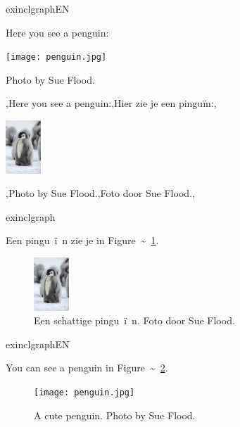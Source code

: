 \documentclass[presentatie.tex]{subfiles}
\begin{document}
\begin{saveblock}{exinclgraphEN}
	\begin{highlightblock}[linewidth=0.95\textwidth,framexleftmargin=0.25em]
		Here you see a penguin:
		\begin{center}
			\texttt{[image: penguin.jpg]}
		\end{center}
		Photo by Sue Flood.
	\end{highlightblock}
\end{saveblock}

\begin{frame}{}
	\vspace{-28px}
	
	\begin{penExResult}
		\lang,Here you see a penguin:,Hier zie je een pinguïn:,
		\begin{center}
			\includegraphics[height=2cm]{assets/pinguin.jpg}
		\end{center}
		\lang,Photo by Sue Flood.,Foto door Sue Flood.,
	\end{penExResult}
\end{frame}

\begin{saveblock}{exinclgraph}
	\begin{highlightblock}[linewidth=0.95\textwidth,framexleftmargin=0.25em]
		Een pingu~\"i~n zie je in Figure~\textasciitilde~\ref{fig:pinguin}.
		\begin{figure}[h]
			\centering
			\includegraphics[height=2cm]{pinguin.jpg}
			\caption{Een schattige pingu~\"i~n. Foto door Sue Flood.}
			\label{fig:pinguin}
		\end{figure}
	\end{highlightblock}
\end{saveblock}

\begin{saveblock}{exinclgraphEN}
	\begin{highlightblock}[linewidth=0.95\textwidth,framexleftmargin=0.25em]
		You can see a penguin in Figure~\textasciitilde~\ref{fig:penguin}.
		\begin{figure}[h]
			\centering
			\texttt{[image: penguin.jpg]}
			\caption{A cute penguin. Photo by Sue Flood.}
			\label{fig:penguin}
		\end{figure}
	\end{highlightblock}
\end{saveblock}
\end{document}
